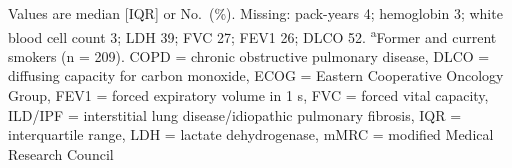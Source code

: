 \documentclass{article}
\begin{document}
\vspace{-0.5\baselineskip}
\noindent\footnotesize
Values are median [IQR] or No.\ (\%). Missing: pack-years 4; hemoglobin 3; white blood cell count 3; LDH 39; FVC 27; FEV1 26; DLCO 52. \textsuperscript{a}Former and current smokers (n = 209). COPD = chronic obstructive pulmonary disease, DLCO = diffusing capacity for carbon monoxide, ECOG = Eastern Cooperative Oncology Group, FEV1 = forced expiratory volume in 1 s, FVC = forced vital capacity, ILD/IPF = interstitial lung disease/idiopathic pulmonary fibrosis, IQR = interquartile range, LDH = lactate dehydrogenase, mMRC = modified Medical Research Council
\normalsize


\end{document}
